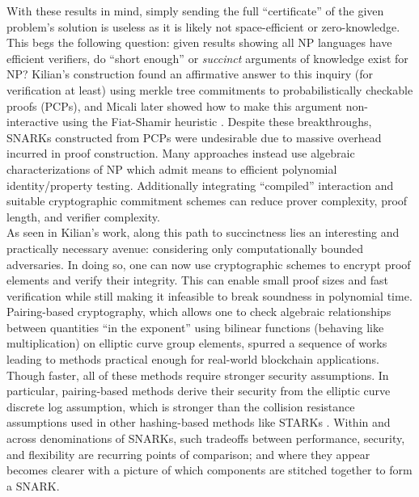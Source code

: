 \noindent With these results in mind, simply sending the full ``certificate'' of the given problem's solution is useless as it is likely not space-efficient or zero-knowledge. This begs the following question: given results showing all NP languages have efficient verifiers, do ``short enough'' or \textit{succinct} arguments of knowledge exist for NP? Kilian's construction \cite{kilian} found an affirmative answer to this inquiry (for verification at least) using merkle tree commitments to probabilistically checkable proofs (PCPs), and Micali later showed how to make this argument non-interactive \cite{micalisnark} using the Fiat-Shamir heuristic \cite{fiatshamir}. Despite these breakthroughs, SNARKs constructed from PCPs were undesirable due to massive overhead incurred in proof construction. Many approaches instead use algebraic characterizations of NP which admit means to efficient polynomial identity/property testing. Additionally integrating ``compiled'' interaction and suitable cryptographic commitment schemes can reduce prover complexity, proof length, and verifier complexity.\\

\noindent As seen in Kilian's work, along this path to succinctness lies an interesting and practically necessary avenue: considering only computationally bounded adversaries. In doing so, one can now use cryptographic schemes to encrypt proof elements and verify their integrity. This can enable small proof sizes and fast verification while still making it infeasible to break soundness in polynomial time. Pairing-based cryptography, which allows one to check algebraic relationships between quantities ``in the exponent'' using bilinear functions (behaving like multiplication) on elliptic curve group elements, spurred a sequence of works leading to methods practical enough for real-world blockchain applications. Though faster, all of these methods require stronger security assumptions. In particular, pairing-based methods derive their security from the elliptic curve discrete log assumption, which is stronger than the collision resistance assumptions used in other hashing-based methods like STARKs \cite{starks}. Within and across denominations of SNARKs, such tradeoffs between performance, security, and flexibility are recurring points of comparison; and where they appear becomes clearer with a picture of which components are stitched together to form a SNARK.


